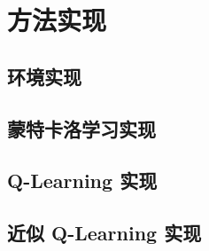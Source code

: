 \section{方法实现}

\subsection{环境实现}

\subsection{蒙特卡洛学习实现}



\subsection{Q-Learning 实现}



\subsection{近似 Q-Learning 实现}


